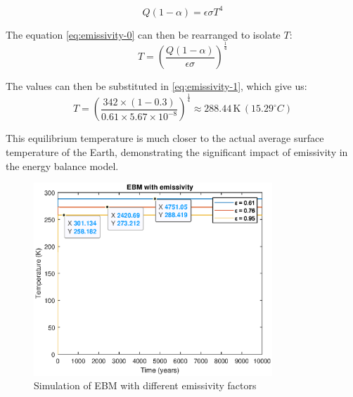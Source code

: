 \documentclass[12pt]{article}
\begin{document}
\begin{equation} \label{eq:emissivity-0}
    Q(1 - \alpha) = \epsilon\sigma T^4
\end{equation}

\noindent The equation \ref{eq:emissivity-0} can then be rearranged to isolate $T$:
\begin{equation} \label{eq:emissivity-1}
    T = \left( \frac{Q(1 - \alpha)}{\epsilon\sigma} \right)^{\frac{1}{4}}
\end{equation}

\noindent The values can then be substituted in \ref{eq:emissivity-1}, which give us:
\begin{equation}
    T = \left( \frac{342 \times (1 - 0.3)}{0.61 \times 5.67 \times 10^{-8}} \right)^{\frac{1}{4}} \approx 288.44 \, \text{K} \, ({15.29}^\circ C)
\end{equation}


This equilibrium temperature is much closer to the actual average surface temperature of the Earth, demonstrating the significant impact of emissivity
in the energy balance model.

\begin{figure}[H]
    \centering
    \includegraphics[width=0.8\textwidth]{images/ebm_emissivity_diff.eps}
    \caption{Simulation of EBM with different emissivity factors}

    \label{fig:ebm_emissivity}
\end{figure}
\end{document}
